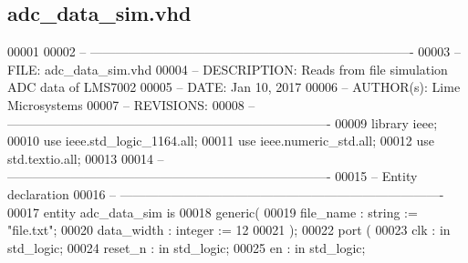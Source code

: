 \subsection{adc\+\_\+data\+\_\+sim.\+vhd}
\label{adc__data__sim_8vhd_source}

\begin{DoxyCode}
00001 
00002 \textcolor{keyword}{-- ---------------------------------------------------------------------------- }
00003 \textcolor{keyword}{-- FILE:    adc\_data\_sim.vhd}
00004 \textcolor{keyword}{-- DESCRIPTION: Reads from file simulation ADC data of LMS7002}
00005 \textcolor{keyword}{-- DATE:    Jan 10, 2017}
00006 \textcolor{keyword}{-- AUTHOR(s):   Lime Microsystems}
00007 \textcolor{keyword}{-- REVISIONS:}
00008 \textcolor{keyword}{-- ---------------------------------------------------------------------------- }
00009 \textcolor{vhdlkeyword}{library }\textcolor{keywordflow}{ieee};
00010 \textcolor{vhdlkeyword}{use }ieee.std\_logic\_1164.\textcolor{keywordflow}{all};
00011 \textcolor{vhdlkeyword}{use }ieee.numeric\_std.\textcolor{keywordflow}{all};
00012 \textcolor{vhdlkeyword}{use }std.textio.\textcolor{keywordflow}{all};
00013 
00014 \textcolor{keyword}{-- ----------------------------------------------------------------------------}
00015 \textcolor{keyword}{-- Entity declaration}
00016 \textcolor{keyword}{-- ----------------------------------------------------------------------------}
00017 \textcolor{keywordflow}{entity }adc_data_sim \textcolor{keywordflow}{is}
00018    \textcolor{keywordflow}{generic}\textcolor{vhdlchar}{(} 
00019         file\_name   : \textcolor{comment}{string}    := "file.txt";
00020       \textcolor{vhdlchar}{data_width}    \textcolor{vhdlchar}{:} \textcolor{comment}{integer}   \textcolor{vhdlchar}{:=} \textcolor{vhdllogic}{}\textcolor{vhdllogic}{12}       
00021     \textcolor{vhdlchar}{)};
00022     \textcolor{keywordflow}{port} \textcolor{vhdlchar}{(}
00023       \textcolor{vhdlchar}{clk}           \textcolor{vhdlchar}{:} \textcolor{keywordflow}{in} \textcolor{comment}{std\_logic};
00024       \textcolor{vhdlchar}{reset_n}       \textcolor{vhdlchar}{:} \textcolor{keywordflow}{in} \textcolor{comment}{std\_logic};
00025         \textcolor{vhdlchar}{en}              \textcolor{vhdlchar}{:} \textcolor{keywordflow}{in} \textcolor{comment}{std\_logic};

\end{DoxyCode}
